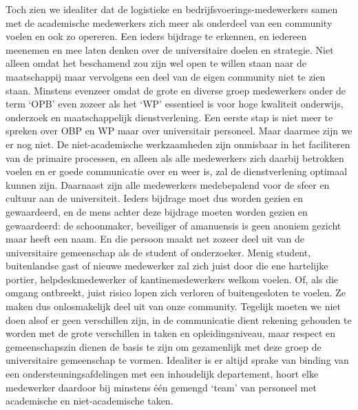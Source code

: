 \documentclass[smallauthor, chapterhaspagenum, nochapterinheader, pagenuminheader,  bigchapnum,medium2, tocpages, garamond, titleinheader]{jote-book}
\begin{document}
	Toch zien we idealiter dat de logistieke en bedrijfsvoerings-medewerkers samen met de academische medewerkers zich meer als onderdeel van een community voelen en ook zo opereren. Een ieders bijdrage te erkennen, en iedereen meenemen en mee laten denken over de universitaire doelen en strategie. Niet alleen omdat het beschamend zou zijn wel open te willen staan naar de maatschappij maar vervolgens een deel van de eigen community niet te zien staan. Minstens evenzeer omdat de grote en diverse groep medewerkers onder de term ‘OPB' even zozeer als het ‘WP' essentieel is voor hoge kwaliteit onderwijs, onderzoek en maatschappelijk dienstverlening. Een eerste stap is niet meer te spreken over OBP en WP maar over universitair personeel. Maar daarmee zijn we er nog niet. De niet-academische werkzaamheden zijn onmisbaar in het faciliteren van de primaire processen, en alleen als alle medewerkers zich daarbij betrokken voelen en er goede communicatie over en weer is, zal de dienstverlening optimaal kunnen zijn. Daarnaast zijn alle medewerkers medebepalend voor de sfeer en cultuur aan de universiteit. Ieders bijdrage moet dus worden gezien en gewaardeerd, en de mens achter deze bijdrage moeten worden gezien en gewaardeerd: de schoonmaker, beveiliger of amanuensis is geen anoniem gezicht maar heeft een naam. En die persoon maakt net zozeer deel uit van de universitaire gemeenschap als de student of onderzoeker. Menig student, buitenlandse gast of nieuwe medewerker zal zich juist door die ene hartelijke portier, helpdeskmedewerker of kantinemedewerkers welkom voelen. Of, als die omgang ontbreekt, juist risico lopen zich verloren of buitengesloten te voelen. Ze maken dus onlosmakelijk deel uit van onze community. Tegelijk moeten we niet doen alsof er geen verschillen zijn, in de communicatie dient rekening gehouden te worden met de grote verschillen in taken en opleidingsniveau, maar respect en gemeenschapszin dienen de basis te zijn om gezamenlijk met deze groep de universitaire gemeenschap te vormen. Idealiter is er altijd sprake van binding van een ondersteuningsafdelingen met een inhoudelijk departement, hoort elke medewerker daardoor bij minstens één gemengd ‘team' van personeel met academische en niet-academische taken.
\end{document}
